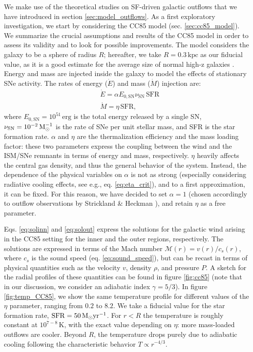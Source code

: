 We make use of the theoretical studies on SF-driven galactic outflows that we have introduced in section \ref{sec:model_outflows}. As a first exploratory investigation, we start by considering the CC85 model (sec. \ref{sec:cc85_model}). We summarize the crucial assumptions and results of the CC85 model in order to assess its validity and to look for possible improvements. The model considers the galaxy to be a sphere of radius $R$; hereafter, we take $R= 0.3\,\mathrm{kpc}$ as our fiducial value, as it is a good estimate for the average size of normal high-z galaxies \citep[e.g.,][]{Dayal:2018hft}. Energy and mass are injected inside the galaxy to model the effects of stationary SNe activity. The rates of energy ($\dot{E}$) and mass ($\dot{M}$) injection are:
\begin{subequations}
\begin{align}
    &\dot{E}=\alpha  E_{0,\mathrm{SN}} \nu_\mathrm{SN} \,\mathrm{SFR}\\
    & \dot{M}=\eta \, \mathrm{SFR},
\end{align}
\end{subequations}
where $E_{0,\mathrm{SN}} = 10^{51}\,\mathrm{erg}$ is the total energy released by a single SN, $\nu_\mathrm{SN}=10^{-2}\,{\rm M}_{\odot}^{-1}$ is the rate of SNe per unit stellar mass, and SFR is the star formation rate. $\alpha$ and $\eta$ are the thermalization efficiency and the mass loading factor: these two parameters express the coupling between the wind and the ISM/SNe remnants in terms of energy and mass, respectively.
$\eta$ heavily affects the central gas density, and thus the general behavior of the system. Instead, the dependence of the physical variables on $\alpha$ is not as strong (especially considering radiative cooling effects, see e.g., eq. \ref{eq:eta_crit}), and to a first approximation, it can be fixed. For this reason, we have decided to set $\alpha=1$ (chosen accordingly to outflow observations by Strickland \& Heckman \citep{strickland2009supernova}), and retain $\eta$ as a free parameter. 

Eqs. \ref{eq:solinn} and \ref{eq:solout} express the solutions for the galactic wind arising in the CC85 setting for the inner and the outer regions, respectively. The solutions are expressed in terms of the Mach number $\mathcal{M}(r)=v(r)/c_s(r)$, where $c_s$ is the sound speed (eq. \ref{eq:sound_speed}), but can be recast in terms of physical quantities such as the velocity $v$, density $\rho$, and pressure $P$. A sketch for the radial profiles of these quantities can be found in figure \ref{fig:cc85} (note that in our discussion, we consider an adiabatic index $\gamma=5/3$). In figure \ref{fig:temp_CC85}, we show the same temperature profile for different values of the $\eta$ parameter, ranging from $0.2$ to $8.2$. We take a fiducial value for the star formation rate, $\mathrm{SFR}=50\,{\rm M}_{\odot}\mathrm{yr}^{-1}$. For $r<R$ the temperature is roughly constant at $10^{7-8}\,\mathrm{K}$, with the exact value depending on $\eta$: more mass-loaded outflows are cooler. Beyond $R$, the temperature drops purely due to adiabatic cooling following the characteristic behavior $T\propto r^{-4/3}$. 

